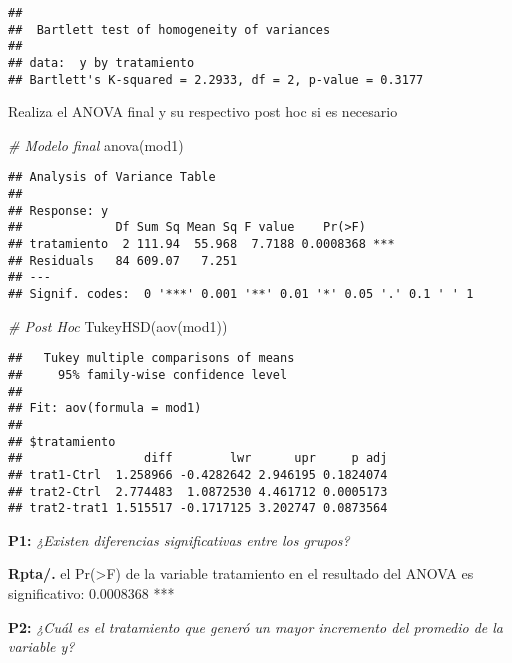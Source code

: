 \documentclass[
]{article}
\newenvironment{Shaded}{}{}
\newcommand{\CommentTok}[1]{\textcolor[rgb]{0.38,0.63,0.69}{\textit{#1}}}
\newcommand{\FunctionTok}[1]{\textcolor[rgb]{0.02,0.16,0.49}{#1}}
\newcommand{\NormalTok}[1]{#1}
\begin{document}
\begin{verbatim}
## 
##  Bartlett test of homogeneity of variances
## 
## data:  y by tratamiento
## Bartlett's K-squared = 2.2933, df = 2, p-value = 0.3177
\end{verbatim}

Realiza el ANOVA final y su respectivo post hoc si es necesario

\begin{Shaded}
\begin{Highlighting}[]
\CommentTok{\# Modelo final }
\FunctionTok{anova}\NormalTok{(mod1)}
\end{Highlighting}
\end{Shaded}

\begin{verbatim}
## Analysis of Variance Table
## 
## Response: y
##             Df Sum Sq Mean Sq F value    Pr(>F)    
## tratamiento  2 111.94  55.968  7.7188 0.0008368 ***
## Residuals   84 609.07   7.251                      
## ---
## Signif. codes:  0 '***' 0.001 '**' 0.01 '*' 0.05 '.' 0.1 ' ' 1
\end{verbatim}

\begin{Shaded}
\begin{Highlighting}[]
\CommentTok{\# Post Hoc}
\FunctionTok{TukeyHSD}\NormalTok{(}\FunctionTok{aov}\NormalTok{(mod1))}
\end{Highlighting}
\end{Shaded}

\begin{verbatim}
##   Tukey multiple comparisons of means
##     95% family-wise confidence level
## 
## Fit: aov(formula = mod1)
## 
## $tratamiento
##                 diff        lwr      upr     p adj
## trat1-Ctrl  1.258966 -0.4282642 2.946195 0.1824074
## trat2-Ctrl  2.774483  1.0872530 4.461712 0.0005173
## trat2-trat1 1.515517 -0.1717125 3.202747 0.0873564
\end{verbatim}

\textbf{P1:} \emph{¿Existen diferencias significativas entre los
grupos?}

\textbf{Rpta/.} el Pr(\textgreater F) de la variable tratamiento en el
resultado del ANOVA es significativo: 0.0008368 ***

\textbf{P2:} \emph{¿Cuál es el tratamiento que generó un mayor
incremento del promedio de la variable y?}
\end{document}
